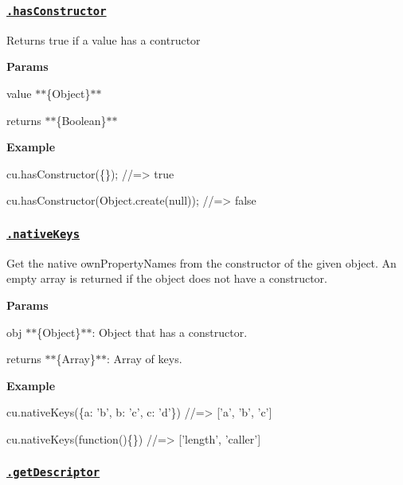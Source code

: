 \subsubsection*{\href{index.js#L152}{\tt .has\+Constructor}}

Returns true if a value has a {\ttfamily contructor}

{\bfseries Params}


\begin{DoxyItemize}
\item {\ttfamily value} $\ast$$\ast$\{Object\}$\ast$$\ast$
\item {\ttfamily returns} $\ast$$\ast$\{Boolean\}$\ast$$\ast$
\end{DoxyItemize}

{\bfseries Example}


\begin{DoxyCode}
cu.hasConstructor(\{\});
//=> true

cu.hasConstructor(Object.create(null));
//=> false
\end{DoxyCode}


\subsubsection*{\href{index.js#L174}{\tt .native\+Keys}}

Get the native {\ttfamily own\+Property\+Names} from the constructor of the given {\ttfamily object}. An empty array is returned if the object does not have a constructor.

{\bfseries Params}


\begin{DoxyItemize}
\item {\ttfamily obj} $\ast$$\ast$\{Object\}$\ast$$\ast$\+: Object that has a {\ttfamily constructor}.
\item {\ttfamily returns} $\ast$$\ast$\{Array\}$\ast$$\ast$\+: Array of keys.
\end{DoxyItemize}

{\bfseries Example}


\begin{DoxyCode}
cu.nativeKeys(\{a: 'b', b: 'c', c: 'd'\})
//=> ['a', 'b', 'c']

cu.nativeKeys(function()\{\})
//=> ['length', 'caller']
\end{DoxyCode}


\subsubsection*{\href{index.js#L208}{\tt .get\+Descriptor}}

